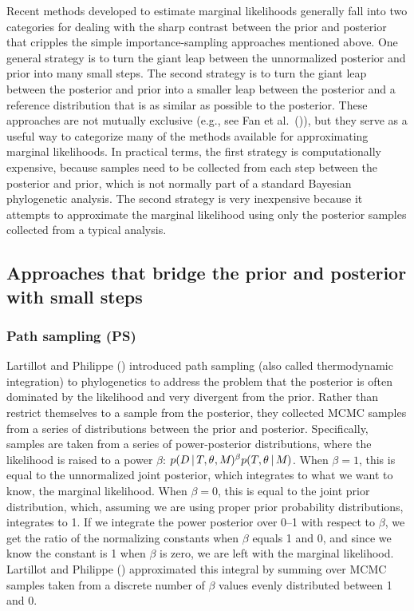 Recent methods developed to estimate marginal likelihoods generally fall into
two categories for dealing with the sharp contrast between the prior
and posterior that cripples the simple importance-sampling approaches
mentioned above.
One general strategy is to turn the giant leap between the unnormalized
posterior and prior into many small steps.
The second strategy is to turn the giant leap between the posterior and prior
into a smaller leap between the posterior and a reference distribution that is
as similar as possible to the posterior.
These approaches are not mutually exclusive (e.g., see Fan et al.\
(\citeyear{Fan2011})), but they serve as a useful way to categorize many of the
methods available for approximating marginal likelihoods.
In practical terms, the first strategy is computationally expensive, because
samples need to be collected from each step between the posterior and prior,
which is not normally part of a standard Bayesian phylogenetic analysis.
The second strategy is very inexpensive because it attempts to approximate the
marginal likelihood using only the posterior samples collected from a
typical analysis.

\subsection{Approaches that bridge the prior and posterior with small steps}

\subsubsection{Path sampling (PS)}
Lartillot and Philippe (\citeyear{Lartillot2006}) introduced path sampling
(also called thermodynamic integration) to phylogenetics to address the problem
that the posterior is often dominated by the likelihood and very divergent from
the prior.
Rather than restrict themselves to a sample from the posterior, they collected
MCMC samples from a series of distributions between the prior and posterior.
Specifically, samples are taken from a series of power-posterior distributions,
where the likelihood is raised to a power $\beta$:
$ p(D \,|\, T, \theta_{}, M_{})^{\beta}
p(T, \theta_{} \,|\, M_{})$.
When $\beta = 1$, this is equal to the unnormalized joint posterior, which
integrates to what we want to know, the marginal likelihood.
When $\beta = 0$, this is equal to the joint prior distribution, which,
assuming we are using proper prior probability distributions, integrates to 1.
If we integrate the power posterior over 0--1 with respect to $\beta$, we get
the ratio of the normalizing constants when $\beta$ equals 1 and 0, and since
we know the constant is 1 when $\beta$ is zero, we are left with the marginal
likelihood.
Lartillot and Philippe (\citeyear{Lartillot2006}) approximated this integral by
summing over MCMC samples taken from a discrete number of $\beta$ values evenly
distributed between 1 and 0.

